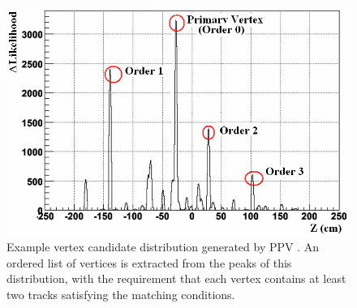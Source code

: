 \begin{figure}
  \includegraphics[width=1.0\textwidth]{figures/ppv-candidate-distribution}
  \caption{Example vertex candidate distribution generated by PPV
  \cite{vertex-finder-starnote}. An ordered list of vertices is extracted from
  the peaks of this distribution, with the requirement that each vertex contains
  at least two tracks satisfying the matching conditions.}
  \label{fig:ppv-candidate-distribution}
\end{figure}
